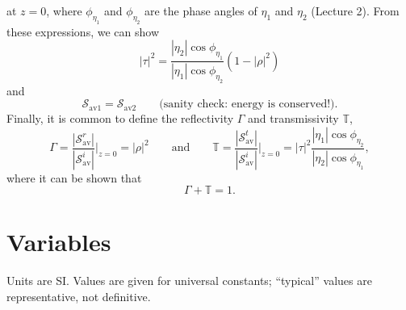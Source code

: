 \documentclass[11pt, oneside]{article}
\begin{document}
at $z = 0$, where $\phi_{\eta_1}$ and $\phi_{\eta_2}$ are the phase angles of $\eta_1$ and $\eta_2$ (Lecture 2). From these expressions, we can show
\begin{equation}
	|\tau|^2 = \frac{|\eta_2|\cos\phi_{\eta_1}}{|\eta_1|\cos\phi_{\eta_2}}\left(1 - |\rho|^2\right)
\end{equation}
and
\begin{equation}
	\boldsymbol{\mathcal{S}}_{\mathrm{av}1} = \boldsymbol{\mathcal{S}}_{\mathrm{av}2} \qquad \text{(sanity check: energy is conserved!)}.
\end{equation}
Finally, it is common to define the reflectivity $\Gamma$ and transmissivity $\mathbb{T}$,
\begin{equation}
	\label{e:RT}
	\Gamma = \frac{\left|\boldsymbol{\mathcal{S}}^r_\mathrm{av}\right|}{\left|\boldsymbol{\mathcal{S}}^i_\mathrm{av}\right|}\bigg|_{z=0} = |\rho|^2
	\qquad \text{and} \qquad
	\mathbb{T} = \frac{\left|\boldsymbol{\mathcal{S}}^t_\mathrm{av}\right|}{\left|\boldsymbol{\mathcal{S}}^i_\mathrm{av}\right|}\bigg|_{z=0} = |\tau|^2\frac{|\eta_1|\cos\phi_{\eta_2}}{|\eta_2|\cos\phi_{\eta_1}},
\end{equation}
where it can be shown that
\begin{equation}
	\Gamma + \mathbb{T} = 1.
\end{equation}

\section*{Variables}

Units are SI. Values are given for universal constants; ``typical'' values are representative, not definitive.
\end{document}
